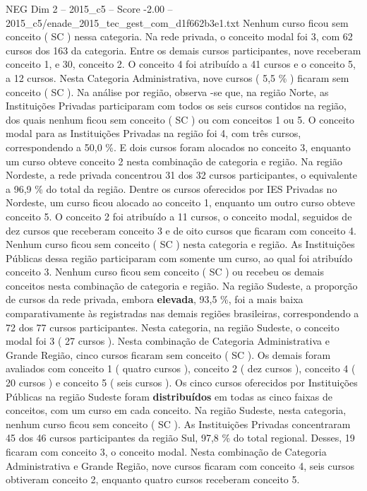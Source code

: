 \begin{textsample}{NEG Dim 2 – 2015\_c5 – Score -2.00 – 2015\_c5/enade\_2015\_tec\_gest\_com\_d1f662b3e1.txt}
Nenhum curso ficou sem conceito ( SC ) nessa categoria.
Na rede privada, o conceito modal foi 3, com 62 cursos dos 163 da categoria.
Entre os demais cursos participantes, nove receberam conceito 1, e 30, conceito 2.
O conceito 4 foi atribuído a 41 cursos e o conceito 5, a 12 cursos.
Nesta Categoria Administrativa, nove cursos ( 5,5 \% ) ficaram sem conceito ( SC ).
Na análise por região, observa -se que, na região Norte, as Instituições Privadas participaram com todos os seis cursos contidos na região, dos quais nenhum ficou sem conceito ( SC ) ou com conceitos 1 ou 5.
O conceito modal para as Instituições Privadas na região foi 4, com três cursos, correspondendo a 50,0 \%.
E dois cursos foram alocados no conceito 3, enquanto um curso obteve conceito 2 nesta combinação de categoria e região.
Na região Nordeste, a rede privada concentrou 31 dos 32 cursos participantes, o equivalente a 96,9 \% do total da região.
Dentre os cursos oferecidos por IES Privadas no Nordeste, um curso ficou alocado ao conceito 1, enquanto um outro curso obteve conceito 5.
O conceito 2 foi atribuído a 11 cursos, o conceito modal, seguidos de dez cursos que receberam conceito 3 e de oito cursos que ficaram com conceito 4.
Nenhum curso ficou sem conceito ( SC ) nesta categoria e região.
As Instituições Públicas dessa região participaram com somente um curso, ao qual foi atribuído conceito 3.
Nenhum curso ficou sem conceito ( SC ) ou recebeu os demais conceitos nesta combinação de categoria e região.
Na região Sudeste, a proporção de cursos da rede privada, embora \textbf{elevada}, 93,5 \%, foi a mais baixa comparativamente às registradas nas demais regiões brasileiras, correspondendo a 72 dos 77 cursos participantes.
Nesta categoria, na região Sudeste, o conceito modal foi 3 ( 27 cursos ).
Nesta combinação de Categoria Administrativa e Grande Região, cinco cursos ficaram sem conceito ( SC ).
Os demais foram avaliados com conceito 1 ( quatro cursos ), conceito 2 ( dez cursos ), conceito 4 ( 20 cursos ) e conceito 5 ( seis cursos ).
Os cinco cursos oferecidos por Instituições Públicas na região Sudeste foram \textbf{distribuídos} em todas as cinco faixas de conceitos, com um curso em cada conceito.
Na região Sudeste, nesta categoria, nenhum curso ficou sem conceito ( SC ).
As Instituições Privadas concentraram 45 dos 46 cursos participantes da região Sul, 97,8 \% do total regional.
Desses, 19 ficaram com conceito 3, o conceito modal.
Nesta combinação de Categoria Administrativa e Grande Região, nove cursos ficaram com conceito 4, seis cursos obtiveram conceito 2, enquanto quatro cursos receberam conceito 5.

\end{textsample}
